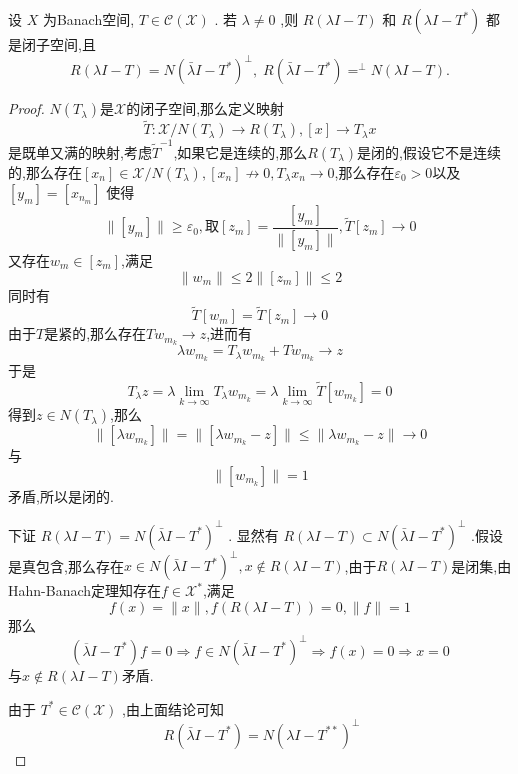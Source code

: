 \documentclass[lang=cn,newtx,10pt,scheme=chinese,thmcnt=chapter]{elegantbook}
\begin{document}
\begin{lemma}
        设 \(X\) 为Banach空间, \(T \in  \mathcal{C}\left( \mathcal{X}\right)\) . 若 \(\lambda  \neq  0\) ,则 \(R\left( {{\lambda I} - T}\right)\) 和 \(R\left( {{\lambda I} - {T}^{ * }}\right)\) 都是闭子空间,且
\begin{equation*}
R\left( {{\lambda I} - T}\right)  = N{\left( \bar{\lambda }I - {T}^{ * }\right) }^{ \bot  },\;R\left( {\bar{\lambda }I - {T}^{ * }}\right) { = }^{ \bot  }N\left( {{\lambda I} - T}\right) .
\end{equation*}
\end{lemma}
\begin{proof}
    $N(T_\lambda)$是$\mathcal{X}$的闭子空间,那么定义映射\[
    \widetilde{T}:\mathcal{X}/N(T_\lambda)\to R(T_\lambda),[x]\to T_\lambda x
    \]
    是既单又满的映射,考虑$\widetilde{T}^{-1}$,如果它是连续的,那么$R(T_\lambda)$是闭的,假设它不是连续的,那么存在$[x_n]\in \mathcal{X}/N(T_\lambda),[x_n]\not\to 0,T_\lambda x_n\to 0$,那么存在$\varepsilon_0>0$以及$[y_m]=[x_{n_{m}}]$
使得\[
\|[y_m]\|\geq \varepsilon_0,\textbf{取}[z_m]=\frac{[y_m]}{\|[y_m]\|},\widetilde{T}[z_m]\to 0
\]
又存在$w_m\in[z_m]$,满足\[
\|w_m\|\leqslant2 \|[z_m]\|\leqslant 2
\]
同时有\[
\widetilde{T}[w_m]=\widetilde{T}[z_m]\to 0
\]
由于$T$是紧的,那么存在$Tw_{m_k}\to z$,进而有
\[\lambda w_{m_k}=T_\lambda w_{m_k}+Tw_{m_k}\to z\]
于是\[T_\lambda z=\lambda\lim\limits_{k\to \infty}T_\lambda w_{m_k}=\lambda\lim\limits_{k\to \infty}\widetilde{T}[w_{m_k}]=0\]
得到$z\in N(T_\lambda)$,那么\[
\|[\lambda w_{m_k}]\|=\|[\lambda w_{m_k}-z]\|\leqslant \|\lambda w_{m_k}-z\|\to 0
\]
与\[\|[w_{m_k}]\|=1\]
矛盾,所以是闭的.

下证 \(R\left( {{\lambda I} - T}\right)  = N{\left( \bar{\lambda }I - {T}^{ * }\right) }^{ \bot  }\) . 显然有 \(R\left( {{\lambda I} - T}\right)  \subset  N{\left( \bar{\lambda }I - {T}^{ * }\right) }^{ \bot  }\) .假设是真包含,那么存在$x\in  N{\left( \bar{\lambda }I - {T}^{ * }\right) }^{ \bot  },x\notin R\left( {{\lambda I} - T}\right)  $,由于$R\left( {{\lambda I} - T}\right) $是闭集,由Hahn-Banach定理知存在$f\in \mathcal{X}^*$,满足\[
f(x)=\|x\|,f(R\left( {{\lambda I} - T}\right) )=0,\|f\|=1
\]
那么\[(\overline{\lambda}I-T^*)f=0\Rightarrow f\in N{\left( \bar{\lambda }I - {T}^{ * }\right) }^{ \bot  }\Rightarrow f(x)=0\Rightarrow x=0\]
与$x\notin R\left( {{\lambda I} - T}\right) $矛盾.

由于 \({T}^{ * } \in  \mathcal{C}\left( \mathcal{X}\right)\) ,由上面结论可知\begin{equation*}
\;R\left( {\bar{\lambda }I - {T}^{ * }}\right) = N{\left( {\lambda }I - {T}^{ ** }\right) }^{ \bot  }
\end{equation*}


\end{proof}
\end{document}
